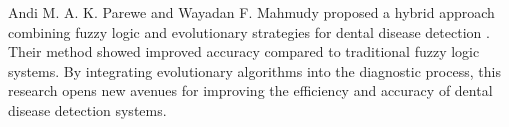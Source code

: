 Andi M. A. K. Parewe and Wayadan F. Mahmudy proposed a hybrid approach combining fuzzy logic and evolutionary strategies for dental disease detection \cite{parewe2018dental}. Their method showed improved accuracy compared to traditional fuzzy logic systems. By integrating evolutionary algorithms into the diagnostic process, this research opens new avenues for improving the efficiency and accuracy of dental disease detection systems.